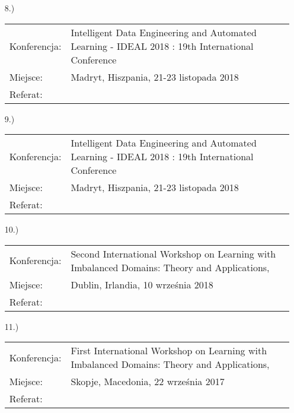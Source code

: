 \begin{fullwidth}
\begin{itemize}
	\item[8.)]~\\
	
	\begin{tabular}{p{7em}p{32.5em}}
	Konferencja:& Intelligent Data Engineering and Automated Learning - IDEAL 2018 : 19th International Conference\\
	Miejsce: & Madryt, Hiszpania, 21-23 listopada 2018\\
	Referat: & \textbf{\fullcite{C9}}		
	\end{tabular}

	\item[9.)]~\\
	
	\begin{tabular}{p{7em}p{32.5em}}
	Konferencja:& Intelligent Data Engineering and Automated Learning - IDEAL 2018 : 19th International Conference\\
	Miejsce: & Madryt, Hiszpania, 21-23 listopada 2018\\
	Referat: & \textbf{\fullcite{Ksi18c}}
	\end{tabular}\newpage

	\item[10.)]~\\
	
	\begin{tabular}{p{7em}p{32.5em}}
	Konferencja:& Second International Workshop on Learning with Imbalanced Domains: Theory and Applications,\\
	Miejsce: & Dublin, Irlandia, 10 września 2018\\
	Referat: & \textbf{\fullcite{C8}}		
	\end{tabular}	

	\item[11.)]~\\
	
	\begin{tabular}{p{7em}p{32.5em}}
	Konferencja:& First International Workshop on Learning with Imbalanced Domains: Theory and Applications,\\
	Miejsce: & Skopje, Macedonia, 22 września 2017\\
	Referat: & \textbf{\fullcite{C11}}		
	\end{tabular}\vspace{1em}					
\end{itemize}
\end{fullwidth}


